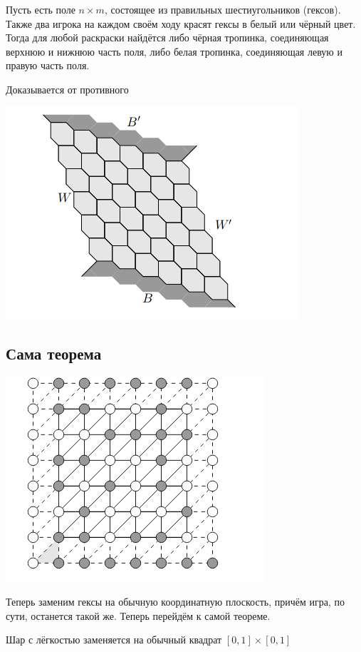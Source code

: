 \documentclass{article}
\begin{document}
			Пусть есть поле $n \times m$, состоящее из правильных шестиугольников (гексов). Также два игрока на каждом своём ходу красят гексы в белый или чёрный цвет. Тогда для любой раскраски найдётся либо чёрная тропинка, соединяющая верхнюю и нижнюю часть поля, либо белая тропинка, соединяющая левую и правую часть поля.
			
			Доказывается от противного
		
			\includegraphics[scale=0.5]{HEX.png}
				
		\subsection{Сама теорема}
		
			\includegraphics[scale=0.45]{NEWHEX.png}
		
			Теперь заменим гексы на обычную координатную плоскость, причём игра, по сути, останется такой же. Теперь перейдём к самой теореме.
			
			Шар с лёгкостью заменяется на обычный квадрат $[0, 1] \times [0, 1]$
			
\end{document}
